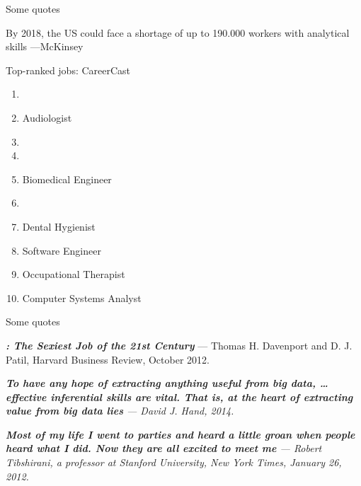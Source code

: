 \documentclass[14pt]{beamer}
\begin{document}
\begin{frame}{Some quotes}
\begin{alertblock}{}
By 2018, the US could face a shortage of up to 190.000 workers with analytical skills ---McKinsey
\end{alertblock}
\pause

\begin{block}{Top-ranked jobs: CareerCast}\fontsize{11}{11}\sf
\begin{enumerate}
\item {}
\item Audiologist
\item {}
\item {}
\item Biomedical Engineer
\item {}
\item Dental Hygienist
\item Software Engineer
\item Occupational Therapist
\item Computer Systems Analyst
\end{enumerate}
\end{block}
\end{frame}

\begin{frame}{Some quotes}

\small
\begin{block}{}
\textit{\textbf{: The Sexiest Job of the 21st Century}} ---  Thomas H. Davenport and D. J. Patil, Harvard Business Review, October 2012.
\end{block}

\begin{block}{}
\textit{\textbf{To have any hope of extracting anything useful from big data, … effective inferential skills are vital. That is, at the heart of extracting value from big data lies } --- David J. Hand, 2014.}
\end{block}


\begin{block}{}
\textit{\textbf{Most of my life I went to parties and heard a little groan when people heard what I did. Now they are all excited to meet me} ---  Robert Tibshirani, a  professor at Stanford University, New York Times, January 26, 2012.}
\end{block}

\end{frame}
\end{document}
